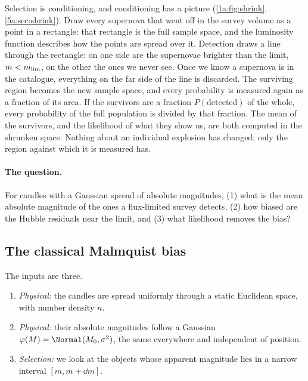 Selection is conditioning, and conditioning has a picture (\cref{1a:fig:shrink}, \cref{5a:sec:shrink}). Draw every supernova that went off in the survey volume as a point in a rectangle: that rectangle is the full sample space, and the luminosity function describes how the points are spread over it. Detection draws a line through the rectangle: on one side are the supernovae brighter than the limit, $m<m_{\rm lim}$, on the other the ones we never see. Once we know a supernova is in the catalogue, everything on the far side of the line is discarded. The surviving region becomes the new sample space, and every probability is measured again as a fraction of its area. If the survivors are a fraction $P(\text{detected})$ of the whole, every probability of the full population is divided by that fraction. The mean of the survivors, and the likelihood of what they show us, are both computed in the shrunken space. Nothing about an individual explosion has changed; only the region against which it is measured has.

\paragraph{The question.} For candles with a Gaussian spread of absolute magnitudes, (1) what is the mean absolute magnitude of the ones a flux-limited survey detects, (2) how biased are the Hubble residuals near the limit, and (3) what likelihood removes the bias?

\subsection{The classical Malmquist bias}

The inputs are three.
\begin{enumerate}[itemsep=1pt]
  \item \emph{Physical:} the candles are spread uniformly through a static Euclidean space, with number density $n$.
  \item \emph{Physical:} their absolute magnitudes follow a Gaussian   $\varphi(M)=\Normal(M_0,\sigma^2)$, the same everywhere and independent of position.
  \item \emph{Selection:} we look at the objects whose apparent magnitude lies in a narrow interval $[m,m+\dd m]$.
\end{enumerate}

